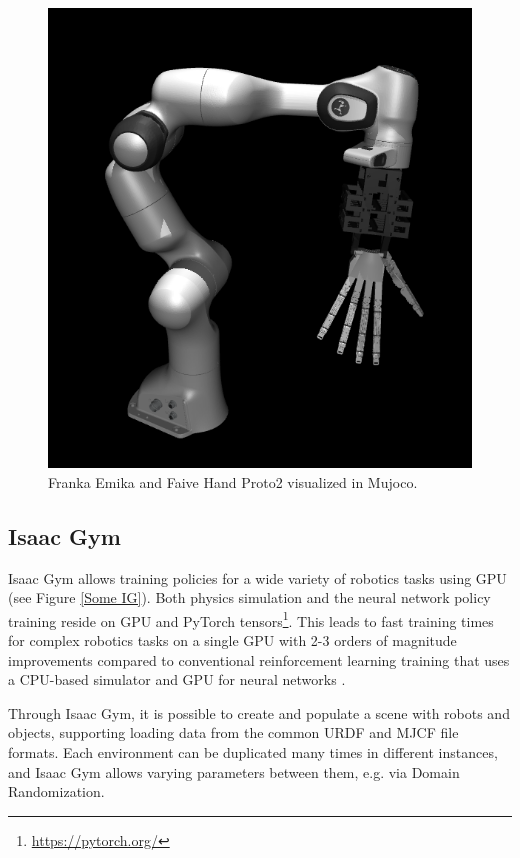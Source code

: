 \documentclass[a4paper]{article}
\begin{document}
\begin{figure}[!hb]
    \centering
    \includegraphics[scale=0.45]{images/Screenshot from 2023-10-15 20-21-24.png}
    \caption{Franka Emika and Faive Hand Proto2 visualized in Mujoco.}
    \label{FPFH}
\end{figure}

\newpage
\subsection{Isaac Gym}
  
    Isaac Gym allows training policies for a wide variety of robotics tasks using GPU (see Figure \ref{Some IG}). Both physics simulation and the neural network policy training reside on GPU and PyTorch tensors\footnote{\url{https://pytorch.org/}}. This leads to fast training times for complex robotics tasks on a single GPU with 2-3 orders of magnitude improvements compared to conventional reinforcement learning training that uses a CPU-based simulator and GPU for neural networks \cite{makoviychuk2021isaac}.
    
    Through Isaac Gym, it is possible to create and populate a scene with robots and objects, supporting loading data from the common URDF and MJCF file formats. Each environment can be duplicated many times in different instances, and Isaac Gym allows varying parameters between them, e.g. via Domain Randomization.
    
\end{document}

